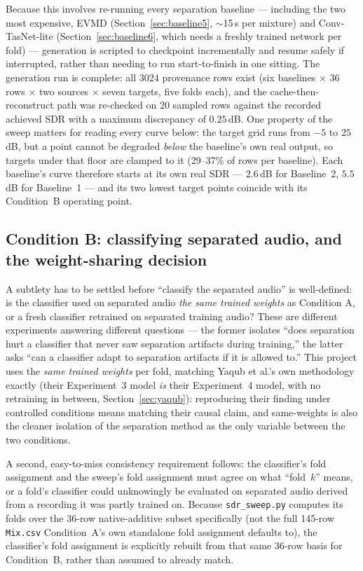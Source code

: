 \documentclass[11pt]{article}
\begin{document}
Because this involves re-running every separation baseline --- including
the two most expensive, EVMD (Section~\ref{sec:baseline5}, $\sim$15\,s per
mixture) and Conv-TasNet-lite (Section~\ref{sec:baseline6}, which needs a
freshly trained network per fold) --- generation is scripted to checkpoint
incrementally and resume safely if interrupted, rather than needing to
run start-to-finish in one sitting. The generation run is complete: all
$3024$ provenance rows exist (six baselines $\times$ 36 rows $\times$ two
sources $\times$ seven targets, five folds each), and the cache-then-
reconstruct path was re-checked on 20 sampled rows against the recorded
achieved SDR with a maximum discrepancy of $0.25$\,dB. One property of the
sweep matters for reading every curve below: the target grid runs from
$-5$ to $25$\,dB, but a point cannot be degraded \emph{below} the
baseline's own real output, so targets under that floor are clamped to it
(29--37\% of rows per baseline). Each baseline's curve therefore starts at
its own real SDR --- $2.6$\,dB for Baseline~2, $5.5$\,dB for Baseline~1
--- and its two lowest target points coincide with its Condition~B
operating point.

\subsection{Condition B: classifying separated audio, and the weight-sharing decision}
\label{sec:conditionb}

A subtlety has to be settled before ``classify the separated audio'' is
well-defined: is the classifier used on separated audio \emph{the same
trained weights} as Condition A, or a fresh classifier retrained on
separated training audio? These are different experiments answering
different questions --- the former isolates ``does separation hurt a
classifier that never saw separation artifacts during training,'' the
latter asks ``can a classifier adapt to separation artifacts if it is
allowed to.'' This project uses the \emph{same trained weights} per fold,
matching Yaqub et al.'s own methodology exactly (their Experiment~3 model
\emph{is} their Experiment~4 model, with no retraining in between,
Section~\ref{sec:yaqub}): reproducing their finding under controlled
conditions means matching their causal claim, and same-weights is also
the cleaner isolation of the separation method as the only variable
between the two conditions.

A second, easy-to-miss consistency requirement follows: the classifier's
fold assignment and the sweep's fold assignment must agree on what
``fold~$k$'' means, or a fold's classifier could unknowingly be evaluated
on separated audio derived from a recording it was partly trained on.
Because \texttt{sdr\_sweep.py} computes its folds over the 36-row
native-additive subset specifically (not the full 145-row \texttt{Mix.csv}
Condition~A's own standalone fold assignment defaults to), the classifier's
fold assignment is explicitly rebuilt from that same 36-row basis for
Condition~B, rather than assumed to already match.
\end{document}
